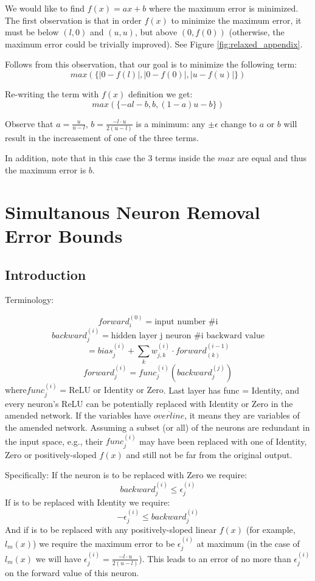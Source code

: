 \documentclass[10pt, conference, twocolumn, compsocconf]{IEEEtran}
\theoremstyle{remark}
\newcommand{\errorMinimizerFunction}{l_m}
\begin{document}
\begin{appendices}
We would like to find $f(x) = ax+b$ where the maximum error is minimized.
The first observation is that in order $f(x)$ to minimize the maximum error,
it must be below $(l, 0)$ and $(u, u)$, but above $(0, f(0))$ (otherwise,
the maximum error could be trivially improved). See Figure \ref{fig:relaxed_appendix}.

Follows from this observation, that our goal is to minimize the following term:
\[
	max(\{|0 - f(l)|, |0 - f(0)|, |u - f(u)|\})
\]

Re-writing the term with $f(x)$ definition we get:
\[
	max(\{-al-b, b, (1-a)u-b\})
\]

Observe that $a = \frac{u}{u - l}$, $b = \frac{-l\cdot u}{2(u - l)}$ is a minimum: any $\pm\epsilon$ change to $a$ or $b$ will result in the increasement of one of the three terms.

In addition, note that in this case the 3 terms inside the $max$ are equal and thus the maximum error is $b$.

\newpage
\onecolumn

\section{Simultanous Neuron Removal Error Bounds}
\label{appendix:sim_error_bounds}

\subsection{Introduction}

Terminology:

\[forward_i^{(0)} = \mbox{input number \#i}\]
\[backward_j^{(i)} = \mbox{hidden layer j neuron \#i backward value}\]
\[= bias_j^{(i)} + \sum_k w_{j,k}^{(i)} \cdot forward^{(i-1)}_{(k)}\]
\[forward_j^{(i)} = func_j^{(i)}(backward_j^{(j)} )\]
$\mbox{where} func_j^{(i)} = \mbox{ReLU or Identity or Zero}$. Last layer has func = Identity, and every neuron's ReLU can be potentially replaced with Identity or Zero in the amended network. If the variables have \(\overline{overline}\), it means they are variables of the amended network. Assuming a subset (or all) of the neurons are redundant in the input space, e.g., their $func_j^{(i)}$ may have been replaced with one of Identity, Zero or positively-sloped $f(x)$ and still not be far from the original output.

Specifically: If the neuron is to be replaced with Zero we require:
\[ backward_j^{(i)} \leq \epsilon_j^{(i)} \]
If is to be replaced with Identity we require:
\[ -\epsilon_j^{(i)} \leq backward_j^{(i)} \]
And if is to be replaced with any positively-sloped linear $f(x)$ (for example, $\errorMinimizerFunction{}(x)$) we require the maximum error to be $\epsilon_j^{(i)}$ at maximum (in the case of $\errorMinimizerFunction{}(x)$ we will have $\epsilon_j^{(i)} = \frac{-l\cdot u}{2(u - l)}$).
This leads to an error of no more than $\epsilon_j^{(i)}$ on the forward value of this neuron.


\end{appendices}
\end{document}
